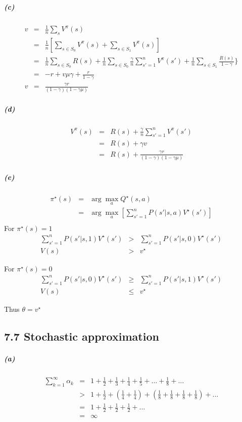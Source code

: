 \documentclass{article}
\begin{document}
\subparagraph*{(c)}
\begin{eqnarray*}
	v &=& \frac{1}{n}\sum_s V^\pi(s)\\
	&=& \frac{1}{n}[\sum_{s \in S_0} V^\pi(s) + \sum_{s \in S_1} V^\pi(s)]\\
	&=& \frac{1}{n}\sum_{s \in S_0} R(s) + \frac{1}{n}\sum_{s \in S_0}\frac{\gamma}{n} \sum_{s'=1}^{n}V^\pi(s') + \frac{1}{n}\sum_{s \in S_1} \frac{R(s)}{1 - \gamma}\}\\
	&=& -r + v \mu \gamma + \frac{r}{1-\gamma}\\
	v &=& \frac{\gamma r}{(1-\gamma)(1-\gamma\mu)}
\end{eqnarray*}

\subparagraph*{(d)}
\begin{eqnarray*}
	V^\pi(s) &=&  R(s) + \frac{\gamma}{n} \sum_{s'=1}^{n}V^\pi(s')\\
	&=&  R(s) + \gamma v\\
	&=& R(s) + \frac{\gamma r}{(1-\gamma)(1-\gamma\mu)}
\end{eqnarray*}

\subparagraph*{(e)}
\begin{eqnarray*}
	\pi^{\star}(s) &=& \arg \max_a Q^{\star}(s,a)\\
	&=& \arg \max_a [\sum_{s'=1}^nP(s'|s,a)V^{\star}(s')]\\
\end{eqnarray*}
For $\pi^{\star}(s) = 1$
\begin{eqnarray*}
	\sum_{s'=1}^nP(s'|s,1)V^{\star}(s') &>& \sum_{s'=1}^nP(s'|s,0)V^{\star}(s')\\
	V(s) &>& v^{\star}
\end{eqnarray*}

For $\pi^{\star}(s) = 0$
\begin{eqnarray*}
	\sum_{s'=1}^nP(s'|s,0)V^{\star}(s') &\ge& \sum_{s'=1}^nP(s'|s,1)V^{\star}(s')\\
	V(s) &\le& v^{\star}
\end{eqnarray*}

Thus $\theta = v^\star$

\subsection*{7.7 Stochastic approximation}
\subparagraph*{(a)}
\begin{eqnarray*}
	\sum_{k=1}^{\infty} \alpha_k &=& 1 + \frac{1}{2} + \frac{1}{3} + \frac{1}{4} + \frac{1}{5} + ... + \frac{1}{8} + ...\\
	&>& 1 + \frac{1}{2} + (\frac{1}{4} + \frac{1}{4}) + (\frac{1}{8} + \frac{1}{8} + \frac{1}{8} + \frac{1}{8}) + ...\\
	&=& 1 + \frac{1}{2} + \frac{1}{2} + \frac{1}{2} + ...\\
	&=& \infty
\end{eqnarray*}
\end{document}
